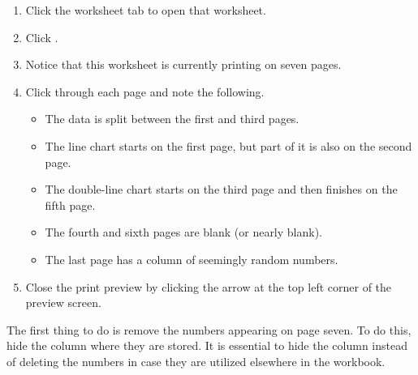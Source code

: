 \begin{enumbox}
	\begin{enumerate}
		\item Click the  worksheet tab to open that worksheet.
		\item Click .
		\item Notice that this worksheet is currently printing on seven pages.
		\item Click through each page and note the following.
	
		\begin{itemize}
			\item The data is split between the first and third pages.
			\item The line chart starts on the first page, but part of it is also on the second page.
			\item The double-line chart starts on the third page and then finishes on the fifth page.
			\item The fourth and sixth pages are blank (or nearly blank).
			\item The last page has a column of seemingly random numbers.
		\end{itemize}
	
		\item Close the print preview by clicking the arrow at the top left corner of the preview screen.
	\end{enumerate}
\end{enumbox}
	
The first thing to do is remove the numbers appearing on page seven. To do this, hide the column where they are stored. It is essential to hide the column instead of deleting the numbers in case they are utilized elsewhere in the workbook.


